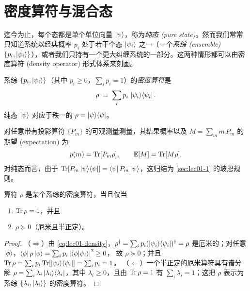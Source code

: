 \section{密度算符与混合态}
\label{sec:lec01-5}

迄今为止，每个态都是单个单位向量 $\ket{\psi}$，称为\emph{纯态 (pure state)}。然而我们常常只知道系统以经典概率 $p_i$ 处于若干个态 $\ket{\psi_i}$ 之一（一个\emph{系综 (ensemble)} $\{p_i,\ket{\psi_i}\}$），或者我们只持有一个更大纠缠系统的一部分。这两种情形都可以由密度算符 (density operator) 形式体系来刻画。

\begin{definition}[密度算符]\label{def:lec01-density}
系综 $\{p_i,\ket{\psi_i}\}$（其中 $p_i\ge0$，$\sum_i p_i=1$）的\emph{密度算符}是
\begin{equation}\label{eq:lec01-density}
  \rho\;=\;\sum_i p_i\,\ket{\psi_i}\!\bra{\psi_i}.
\end{equation}
纯态 $\ket{\psi}$ 对应于秩一的 $\rho=\ket{\psi}\!\bra{\psi}$。
\end{definition}

对任意带有投影算符 $\{P_m\}$ 的可观测量测量，其结果概率以及 $M=\sum_m m\,P_m$ 的期望 (expectation) 为
\begin{equation}\label{eq:lec01-bornrho}
  p(m)=\operatorname{Tr}[P_m\rho],\qquad \mathbb{E}[M]=\operatorname{Tr}[M\rho],
\end{equation}
对纯态而言，由于 $\operatorname{Tr}[P_m\ket{\psi}\!\bra{\psi}]=\bra{\psi}P_m\ket{\psi}$，这归结为 \cref{sec:lec01-1} 的玻恩规则。

\begin{proposition}[密度算符的刻画]\label{prop:lec01-densitychar}
算符 $\rho$ 是某个系综的密度算符，当且仅当
\begin{enumerate}[label=(\roman*)]
  \item $\operatorname{Tr}\rho=1$，并且
  \item $\rho\succeq0$（厄米且半正定）。
\end{enumerate}
\end{proposition}

\begin{proof}
（$\Rightarrow$）由 \eqref{eq:lec01-density}，$\rho^{\dagger}=\sum_i p_i(\ket{\psi_i}\!\bra{\psi_i})^{\dagger}=\rho$
是厄米的；对任意 $\ket{\phi}$，$\bra{\phi}\rho\ket{\phi}=\sum_i p_i\left\lvert \braket{\phi|\psi_i} \right\rvert^{2}\ge0$，
故 $\rho\succeq0$；并且 $\operatorname{Tr}\rho=\sum_i p_i\operatorname{Tr}[\ket{\psi_i}\!\bra{\psi_i}]=\sum_i p_i=1$。
（$\Leftarrow$）一个半正定的厄米算符具有谱分解
$\rho=\sum_i\lambda_i\ket{\lambda_i}\!\bra{\lambda_i}$，其中 $\lambda_i\ge0$，且由
$\operatorname{Tr}\rho=1$ 有 $\sum_i\lambda_i=1$；这把 $\rho$ 表示为系综
$\{\lambda_i,\ket{\lambda_i}\}$ 的密度算符。
\end{proof}

